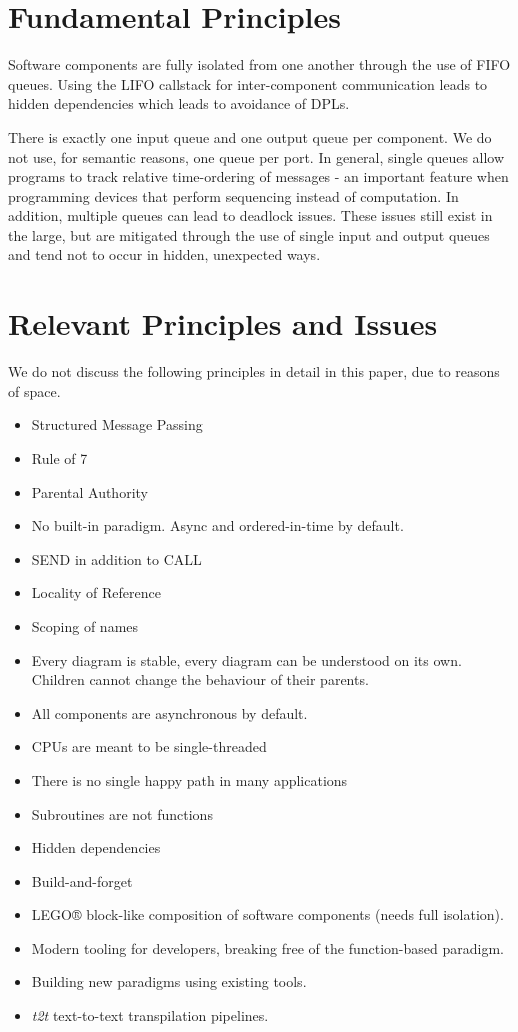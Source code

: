 \documentclass[10pt]{acmart}
\begin{document}
\section{Fundamental Principles}
Software components are fully isolated from one another through the use
of FIFO queues. Using the LIFO callstack for inter-component
communication leads to hidden dependencies which leads to avoidance of
DPLs.

There is exactly one input queue and one output queue per component. We
do not use, for semantic reasons, one queue per port. In general, single
queues allow programs to track relative time-ordering of messages - an
important feature when programming devices that perform sequencing
instead of computation. In addition, multiple queues can lead to
deadlock issues. These issues still exist in the large, but are
mitigated through the use of single input and output queues and tend not
to occur in hidden, unexpected ways.

\section{Relevant Principles and Issues}
We do not discuss the following principles in detail in this paper, due
to reasons of space.

\begin{itemize}
\item Structured Message Passing
\item Rule of 7
\item Parental Authority
\item No built-in paradigm. Async and ordered-in-time by default.
\item SEND in addition to CALL
\item Locality of Reference
\item Scoping of names
\item Every diagram is stable, every diagram can be understood on its own.
Children cannot change the behaviour of their parents.
\item All components are asynchronous by default.
\item CPUs are meant to be single-threaded
\item There is no single happy path in many applications
\item Subroutines are not functions
\item Hidden dependencies
\item Build-and-forget
\item LEGO® block-like composition of software components (needs full
isolation).
\item Modern tooling for developers, breaking free of the function-based
paradigm.
\item Building new paradigms using existing tools.
\item \emph{t2t} text-to-text transpilation pipelines.
\end{itemize}
\end{document}
